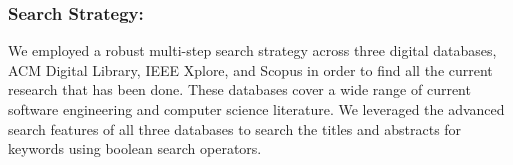 \documentclass[sigconf]{acmart}
\begin{document}

\subsubsection{Search Strategy:}

We employed a robust multi-step search strategy across three digital databases, ACM Digital Library,
IEEE Xplore, and Scopus in order to find all the current research that has been done. These
databases cover a wide range of current software engineering and computer science literature. We
leveraged the advanced search features of all three databases to search the titles and abstracts for
keywords using boolean search operators.
\end{document}
